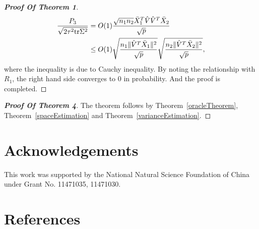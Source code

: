 \documentclass[review]{elsarticle}
\theoremstyle{plain}
\theoremstyle{definition}
\theoremstyle{remark}
\begin{document}
\begin{proof}[\textbf{Proof Of Theorem 1}]
\begin{align}
    \frac{P_3}{\sqrt{2\tau^2\mathrm{tr}\Sigma^2}}&=O(1)\frac{\sqrt{n_1n_2}\bar{X}_1^T\hat{V}\hat{V}^T\bar{X}_2}{\sqrt{p}}\notag
\\
    &\leq O(1)\sqrt{\frac{n_1\|\hat{V}^T\bar{X}_1\|^2}{\sqrt{p}}}\sqrt{\frac{{n_2}\|\hat{V}^T\bar{X}_2\|^2}{\sqrt{p}}},\notag
\end{align}
where the inequality is due to Cauchy inequality. By noting the relationship with  $R_1$, the right hand side converges to $0$ in probability. And the proof is completed.



\end{proof}




\begin{proof}[\textbf{Proof Of Theorem 4}]
    The theorem follows by Theorem~\ref{oracleTheorem}, Theorem~\ref{spaceEstimation} and Theorem~\ref{varianceEstimation}.
\end{proof}





\section*{Acknowledgements}
This work was supported by the National Natural Science Foundation of China under Grant No. 11471035, 11471030.


\section*{References}


\end{document}
